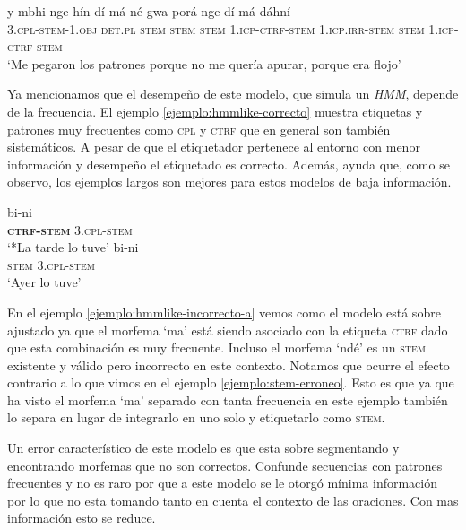 \documentclass[letterpaper,12pt,oneside]{book}
\newcommand{\note}[4][]{\todo[author=#2,color=#3,size=\scriptsize,fancyline,caption={},#1]{#4}} %
\newcommand{\diego}[2][]{\note[#1]{Diego}{blue!40}{#2}}
\newcommand{\Diego}[2][]{\diego[inline,#1]{#2}\noindent}
\theoremstyle{definition}
\begin{document}
\Diego{Revisar el error y la frase}
\begin{exe} 
    \ex {} {y{\iota}} {mb{\mu}hi} {nge} {hín} {dí-má-né} {gwa-porá} {nge} {dí-má-dáhní}\\
    {\textsc{3.cpl-stem-1.obj}} {\textsc{det.pl}} {\textsc{stem}} {\textsc{stem}} {\textsc{stem}} {\textsc{1.icp-ctrf-stem}} {\textsc{1.icp.irr-stem}} {\textsc{stem}} {\textsc{1.icp-ctrf-stem}}\\
    \trans `Me pegaron los patrones porque no me quería apurar, porque era flojo'
    \label{ejemplo:hmmlike-correcto}
\end{exe} 

Ya mencionamos que el desempeño de este modelo, que simula un \textit{HMM}, depende de la frecuencia. El ejemplo \ref{ejemplo:hmmlike-correcto} muestra etiquetas y patrones muy frecuentes como \textsc{cpl} y \textsc{ctrf} que en general son también sistemáticos. A pesar de que el etiquetador pertenece al entorno con menor información y desempeño el etiquetado es correcto. Además, ayuda que, como se observo, los ejemplos largos son mejores para estos modelos de baja información.

\begin{exe}
    \ex \begin{xlist}
        \ex {} {bi-ni}\\
        {\textbf{\textsc{ctrf-stem}}} {\textsc{3.cpl-stem}}\\
        \trans `*La tarde lo tuve' \label{ejemplo:hmmlike-incorrecto-a}
        \ex {} {bi-ni}\\
        {\textsc{stem}} {\textsc{3.cpl-stem}}\\
        \trans `Ayer lo tuve' \label{ejemplo:hmmlike-incorrecto-b}
        \end{xlist}
\end{exe}

En el ejemplo \ref{ejemplo:hmmlike-incorrecto-a} vemos como el modelo está sobre ajustado ya que el morfema `ma' está siendo asociado con la etiqueta \textsc{ctrf} dado que esta combinación es muy frecuente. Incluso el morfema `ndé' es un \textsc{stem} existente y válido pero incorrecto en este contexto. Notamos que ocurre el efecto contrario a lo que vimos en el ejemplo \ref{ejemplo:stem-erroneo}. Esto es que ya que ha visto el morfema `ma' separado con tanta frecuencia en este ejemplo también lo separa en lugar de integrarlo en uno solo y etiquetarlo como \textsc{stem}.

Un error característico de este modelo es que esta sobre segmentando y encontrando morfemas que no son correctos. Confunde secuencias con patrones frecuentes y no es raro por que a este modelo se le otorgó mínima información por lo que no esta tomando tanto en cuenta el contexto de las oraciones. Con mas información esto se reduce.
\end{document}
